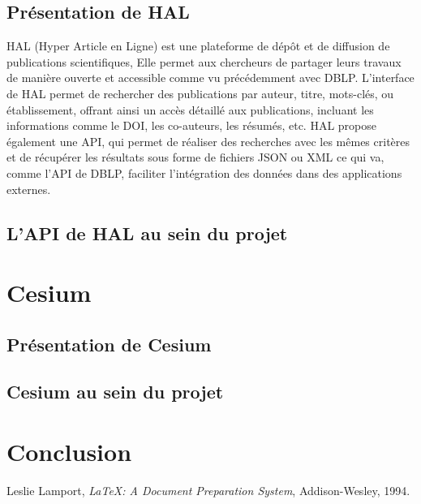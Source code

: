 \documentclass[a4paper,12pt]{article}
\begin{document}
\subsection{Présentation de HAL}
HAL (Hyper Article en Ligne) est une plateforme de dépôt et de diffusion de publications scientifiques, Elle permet aux chercheurs de partager leurs travaux de manière ouverte et accessible comme vu précédemment avec DBLP. L'interface de HAL 
permet de rechercher des publications par auteur, titre, mots-clés, ou établissement, offrant ainsi un accès détaillé aux publications, incluant les informations comme le DOI, les co-auteurs, les résumés, etc. HAL propose également une API, 
qui permet de réaliser des recherches avec les mêmes critères et de récupérer les résultats sous forme de fichiers JSON ou XML ce qui va, comme l'API de DBLP, faciliter l'intégration des données dans des applications externes.

\subsection{L'API de HAL au sein du projet}


\section{Cesium}
\subsection{Présentation de Cesium}
\subsection{Cesium au sein du projet}


\section{Conclusion}


\newpage
\begin{thebibliography}{9}
     Leslie Lamport, \textit{LaTeX: A Document Preparation System}, Addison-Wesley, 1994.
\end{thebibliography}
\end{document}
